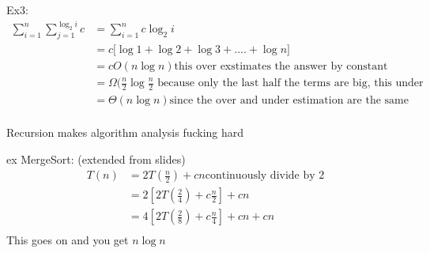 \documentclass[12pt]{article}
\begin{document}
Ex3:
\begin{align*}
\displaystyle\sum_{i=1}^n \displaystyle\sum_{j=1}^{\log_2 i} c &= \displaystyle\sum_{i=1}^n c\log_2 i \\
&= c \bigg [\log 1 + \log 2 + \log 3 + .... + \log n \bigg ]\\
&= cO(n\log n) \text{this over exstimates the answer by constant}\\
&= \Omega (\frac{n}{2} \log \frac{n}{2} \text{ because only the last half the terms are big, this under estimates it, but by a constant}\\
&= \Theta (n\log n) \text{since the over and under estimation are the same}\\
\end{align*}

Recursion makes algorithm analysis fucking hard

ex MergeSort: (extended from slides)
\begin{align*}
T(n) &= 2T(\frac{n}{2}) + cn \text{continuously divide by 2}\\
&= 2[2T(\frac{2}{4}) +c\frac{n}{2}] + cn\\
&= 4[2T(\frac{2}{8}) +c\frac{n}{4}] + cn +cn\\
\end{align*}
This goes on and you get $ n\log n$\\
\end{document}
